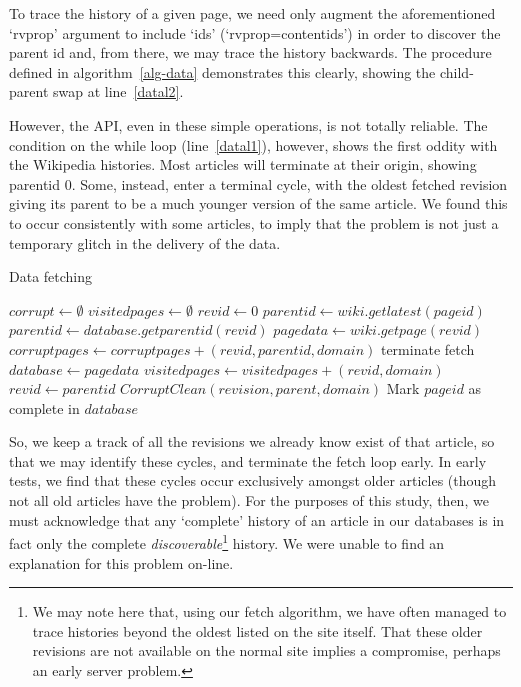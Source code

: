 To trace the history of a given page, we need only augment the
aforementioned `rvprop' argument to include `ids'
(`rvprop=content{\textbar}ids') in order to discover the parent id and, from
there, we may trace the history backwards. The procedure defined in
algorithm~\ref{alg-data} demonstrates this clearly, showing the
child-parent swap at line~\ref{datal2}. 

However, the API, even in these simple operations, is not totally
reliable. The condition on the while loop (line~\ref{datal1}),
however, shows the first oddity with the Wikipedia histories. Most
articles will terminate at their origin, showing parentid 0. Some,
instead, enter a terminal cycle, with the oldest fetched revision
giving its parent to be a much younger version of the same article. We
found this to occur consistently with some articles, to imply that the
problem is not just a temporary glitch in the delivery of the data.

\begin{algorithm}
  \caption{Data fetching}\label{alg-data}
  \begin{algorithmic}
    \State $corrupt \gets \emptyset$
    \State $visitedpages \gets \emptyset$
    \State $revid \gets 0$
    \State $parentid \gets wiki.getlatest(pageid)$
    \label{datal1} 
    \State $parentid \gets database.getparentid(revid)$
    \Else
    \State $pagedata \gets wiki.getpage(revid)$
    \EndIf
    \label{datal3}
    \State $corruptpages \gets corruptpages + (revid, parentid, domain)$
    \Else
    \State terminate fetch\label{datal4}
    \EndIf
    \Else
    \State $database \gets page data$
    \EndIf
    \State $visitedpages \gets visitedpages + (revid, domain)$
    \State $revid \gets parentid$\label{datal2}
    \EndWhile
    \State $CorruptClean(revision, parent, domain)$
    \EndFor
    \State Mark $pageid$ as complete in $database$
    \EndProcedure
  \end{algorithmic}
\end{algorithm}

So, we keep a track of all the revisions we already know exist of that
article, so that we may identify these cycles, and terminate the fetch
loop early. In early tests, we find that these cycles occur
exclusively amongst older articles (though not all old articles have
the problem). For the purposes of this study, then, we must
acknowledge that any `complete' history of an article in our databases
is in fact only the complete \textit{discoverable}\footnote{We may
  note here that, using our fetch algorithm, we have often managed to
  trace histories beyond the oldest listed on the site itself. That
  these older revisions are not available on the normal site implies a
  compromise, perhaps an early server problem.}  history. We were
unable to find an explanation for this problem on-line.

